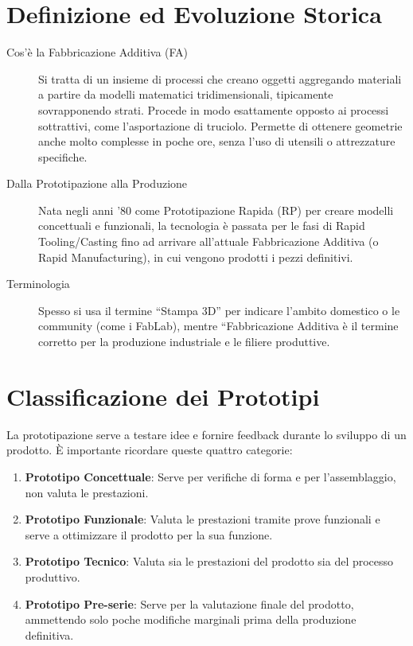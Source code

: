 %
%
\section{Definizione ed Evoluzione Storica}
\begin{description}
    \item [Cos'è la Fabbricazione Additiva (FA)] Si tratta di un insieme di processi che creano oggetti aggregando materiali a partire da modelli matematici tridimensionali, tipicamente sovrapponendo strati. Procede in modo esattamente opposto ai processi sottrattivi, come l'asportazione di truciolo. Permette di ottenere geometrie anche molto complesse in poche ore, senza l'uso di utensili o attrezzature specifiche.
    \item [Dalla Prototipazione alla Produzione] Nata negli anni '80 come Prototipazione Rapida (RP) per creare modelli concettuali e funzionali, la tecnologia è passata per le fasi di Rapid Tooling/Casting fino ad arrivare all'attuale Fabbricazione Additiva (o Rapid Manufacturing), in cui vengono prodotti i pezzi definitivi.
    \item [Terminologia] Spesso si usa il termine ``Stampa 3D'' per indicare l'ambito domestico o le community (come i FabLab), mentre ``Fabbricazione Additiva è il termine corretto per la produzione industriale e le filiere produttive.
\end{description}

%
\section{Classificazione dei Prototipi}
La prototipazione serve a testare idee e fornire feedback durante lo sviluppo di un prodotto. È importante ricordare queste quattro categorie:
\begin{enumerate}
    \item \textbf{Prototipo Concettuale}: Serve per verifiche di forma e per l'assemblaggio, non valuta le prestazioni.
    \item \textbf{Prototipo Funzionale}: Valuta le prestazioni tramite prove funzionali e serve a ottimizzare il prodotto per la sua funzione.
    \item \textbf{Prototipo Tecnico}: Valuta sia le prestazioni del prodotto sia del processo produttivo.
    \item \textbf{Prototipo Pre-serie}: Serve per la valutazione finale del prodotto, ammettendo solo poche modifiche marginali prima della produzione definitiva.
\end{enumerate}

